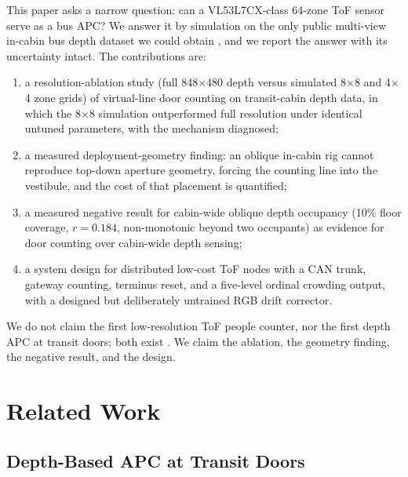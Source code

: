 \documentclass[conference]{IEEEtran}
\begin{document}
This paper asks a narrow question: can a VL53L7CX-class 64-zone ToF sensor
serve as a bus APC? We answer it by simulation on the only public multi-view
in-cabin bus depth dataset we could obtain \cite{gorelik2026}, and we report
the answer with its uncertainty intact. The contributions are:
\begin{enumerate}
  \item a resolution-ablation study (full 848$\times$480 depth versus
        simulated 8$\times$8 and 4$\times$4 zone grids) of virtual-line door
        counting on transit-cabin depth data, in which the 8$\times$8
        simulation outperformed full resolution under identical untuned
        parameters, with the mechanism diagnosed;
  \item a measured deployment-geometry finding: an oblique in-cabin rig cannot
        reproduce top-down aperture geometry, forcing the counting line into
        the vestibule, and the cost of that placement is quantified;
  \item a measured negative result for cabin-wide oblique depth occupancy
        (10\% floor coverage, $r=0.184$, non-monotonic beyond two occupants)
        as evidence for door counting over cabin-wide depth sensing;
  \item a system design for distributed low-cost ToF nodes with a CAN trunk,
        gateway counting, terminus reset, and a five-level ordinal crowding
        output, with a designed but deliberately untrained RGB drift
        corrector.
\end{enumerate}
We do not claim the first low-resolution ToF people counter, nor the first
depth APC at transit doors; both exist \cite{lu2021,jeong2025,stec2019,%
seidel2021,seo2026,yahiaoui2010}. We claim the ablation, the geometry finding,
the negative result, and the design.

\section{Related Work}
\label{sec:related}

\subsection{Depth-Based APC at Transit Doors}
\end{document}
